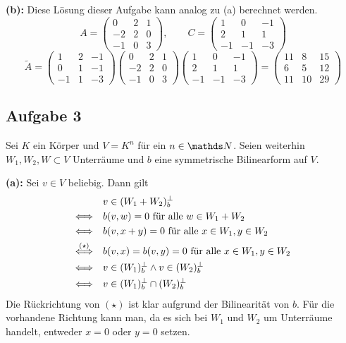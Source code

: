 			\textbf{(b):}
			Diese Lösung dieser Aufgabe kann analog zu (a) berechnet werden.
			\[
				A =
				\begin{pmatrix}
					0 & 2 & 1 \\
					-2 & 2 & 0 \\
					-1 & 0 & 3
				\end{pmatrix},\qquad
				C =
				\begin{pmatrix}
					1 & 0 & -1 \\
					2 & 1 & 1 \\
					-1 & -1 & -3
				\end{pmatrix}
			\]
			\[ \tilde{A} = 
				\begin{pmatrix}
					1 & 2 & -1 \\
					0 & 1 & -1 \\
					-1 & 1 & -3
				\end{pmatrix}
				\begin{pmatrix}
					0 & 2 & 1 \\
					-2 & 2 & 0 \\
					-1 & 0 & 3
				\end{pmatrix}
				\begin{pmatrix}
					1 & 0 & -1 \\
					2 & 1 & 1 \\
					-1 & -1 & -3
				\end{pmatrix}
				=
				\begin{pmatrix}
					11 & 8 & 15 \\
					6 & 5 & 12 \\
					11 & 10 & 29
				\end{pmatrix}
			\]


		\subsection*{Aufgabe 3} %
		\label{sub:aufgabe_3}
		
			Sei $K$ ein Körper und $V=K^n$ für ein $n\in\SN$.
			Seien weiterhin $W_1,W_2,W\subset V$ Unterräume und $b$ eine symmetrische Bilinearform auf $V$.

			\textbf{(a):}
			Sei $v\in V$ beliebig. Dann gilt
			\begin{alignat*}{3}
				&v\in (W_1+W_2)_b^\perp \\
				\Longleftrightarrow \quad &b(v,w) = 0 \text{ für alle } w\in W_1+W_2 \\
				\Longleftrightarrow \quad &b(v,x+y) = 0 \text{ für alle } x\in W_1,y\in W_2 \\
				\stackrel{(\star)}{\Longleftrightarrow} \quad &b(v,x) = b(v,y) = 0 \text{ für alle } x\in W_1,y\in W_2 \\
				\Longleftrightarrow \quad &v\in (W_1)_b^\perp \wedge v\in (W_2)_b^\perp \\
				\Longleftrightarrow \quad &v\in (W_1)_b^\perp \cap (W_2)_b^\perp
			\end{alignat*}
			Die Rückrichtung von $(\star)$ ist klar aufgrund der Bilinearität von $b$.
			Für die vorhandene Richtung kann man, da es sich bei $W_1$ und $W_2$ um Unterräume handelt, entweder $x=0$ oder $y=0$ setzen.
			\qedbox

